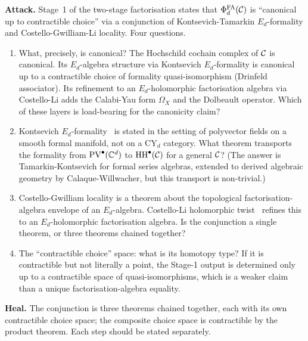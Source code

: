 \textbf{Attack.} Stage~1 of the two-stage factorisation states that
$\Phi^{\mathrm{FA}}_d(\mathcal{C})$ is ``canonical up to contractible choice'' via a
conjunction of Kontsevich-Tamarkin $E_d$-formality and Costello-Gwilliam-Li
locality. Four questions.
\begin{enumerate}
\item[Q1.] What, precisely, is canonical? The Hochschild cochain
complex of $\mathcal{C}$ is canonical. Its $E_d$-algebra structure via
Kontsevich $E_d$-formality is canonical up to a contractible choice of
formality quasi-isomorphism (Drinfeld associator). Its refinement to
an $E_d$-holomorphic factorisation algebra via Costello-Li adds the
Calabi-Yau form $\Omega_X$ and the Dolbeault operator. Which of these
layers is load-bearing for the canonicity claim?
\item[Q2.] Kontsevich $E_d$-formality~\cite{Kontsevich1999} is stated
in the setting of polyvector fields on a smooth formal manifold, not
on a CY$_d$ category. What theorem transports the formality from
$\mathrm{PV}^\bullet(\mathbb{C}^d)$ to $\mathrm{HH}^\bullet(\mathcal{C})$ for a general
$\mathcal{C}$? (The answer is Tamarkin-Kontsevich for formal series algebras,
extended to derived algebraic geometry by Calaque-Willwacher, but this
transport is non-trivial.)
\item[Q3.] Costello-Gwilliam locality is a theorem about the topological
factorisation-algebra envelope of an $E_d$-algebra. Costello-Li
holomorphic twist~\cite{CostelloLi2016,CostelloLi2020} refines this to
an $E_d$-holomorphic factorisation algebra. Is the conjunction a
single theorem, or three theorems chained together?
\item[Q4.] The ``contractible choice'' space: what is its homotopy type?
If it is contractible but not literally a point, the Stage-1 output is
determined only up to a contractible space of quasi-isomorphisms,
which is a weaker claim than a unique factorisation-algebra equality.
\end{enumerate}

\textbf{Heal.} The conjunction is three theorems chained together, each
with its own contractible choice space; the composite choice space is
contractible by the product theorem. Each step should be stated
separately.


